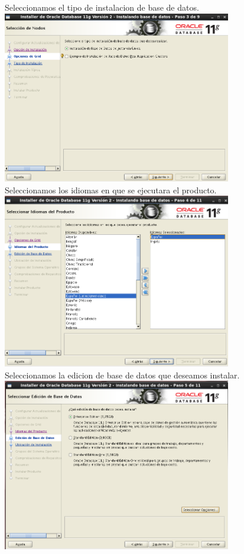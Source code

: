 \documentclass[12pt,letterpaper]{article}
\begin{document}
\begin{center}
Seleccionamos el tipo de instalacion de base de datos.\\
\includegraphics[width=10cm]{./oraclelinux/14.png}\\
Seleccionamos los idiomas en que se ejecutara el producto.\\
\includegraphics[width=10cm]{./oraclelinux/15.png}\\
Seleccionamos la edicion de base de datos que deseamos instalar.\\
\includegraphics[width=10cm]{./oraclelinux/16.png}\\

\end{center}
\end{document}
